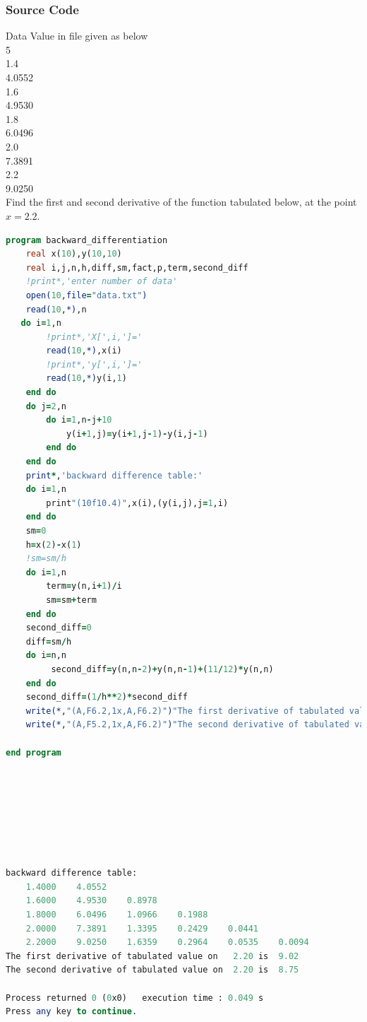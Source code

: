 \documentclass{article}
\begin{document}
\subsubsection{Source Code}
Data Value in file given as below\\
5\\
1.4\\
4.0552\\
1.6\\
4.9530\\
1.8\\
6.0496\\
2.0\\
7.3891\\
2.2\\
9.0250\\
Find the first and second derivative of the function tabulated below, at the point $x=2.2$.



\begin{lstlisting}[language=Fortran,caption=Numerical Backward Differentiation]
program backward_differentiation
    real x(10),y(10,10)
    real i,j,n,h,diff,sm,fact,p,term,second_diff
    !print*,'enter number of data'
    open(10,file="data.txt")
    read(10,*),n
   do i=1,n
        !print*,'X[',i,']='
        read(10,*),x(i)
        !print*,'y[',i,']='
        read(10,*)y(i,1)
    end do
    do j=2,n
        do i=1,n-j+10
            y(i+1,j)=y(i+1,j-1)-y(i,j-1)
        end do
    end do
    print*,'backward difference table:'
    do i=1,n
        print"(10f10.4)",x(i),(y(i,j),j=1,i)
    end do
    sm=0
    h=x(2)-x(1)
    !sm=sm/h
    do i=1,n
        term=y(n,i+1)/i
        sm=sm+term
    end do
    second_diff=0
    diff=sm/h
    do i=n,n
         second_diff=y(n,n-2)+y(n,n-1)+(11/12)*y(n,n)
    end do
    second_diff=(1/h**2)*second_diff
    write(*,"(A,F6.2,1x,A,F6.2)")"The first derivative of tabulated value on ",x(n),"is",diff
    write(*,"(A,F5.2,1x,A,F6.2)")"The second derivative of tabulated value on ",X(n),"is",second_diff

end program









\end{lstlisting}
\begin{lstlisting}[language=Fortran,caption=Numerical Backward Differentiation Output]
 backward difference table:
    1.4000    4.0552
    1.6000    4.9530    0.8978
    1.8000    6.0496    1.0966    0.1988
    2.0000    7.3891    1.3395    0.2429    0.0441
    2.2000    9.0250    1.6359    0.2964    0.0535    0.0094
The first derivative of tabulated value on   2.20 is  9.02
The second derivative of tabulated value on  2.20 is  8.75

Process returned 0 (0x0)   execution time : 0.049 s
Press any key to continue.
 
\end{lstlisting}
\end{document}
